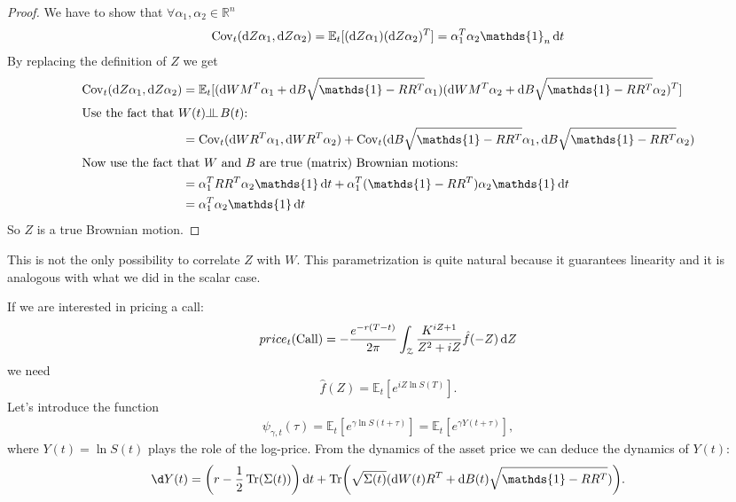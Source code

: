 \begin{proof}
    We have to show that $\forall \alpha_1,\alpha_2\in\mathbb{R}^n$
    \begin{align*}
        \Cov_t(\dd Z\alpha_1, \dd Z\alpha_2) = \mathbb{E}_t[(\dd Z\alpha_1)(\dd Z\alpha_2)^T] = \alpha_1^T\alpha_2\mathds{1}_n\,\dd t
    \end{align*}
    By replacing the definition of $Z$ we get
    \begin{align*}
        \Cov_t(\dd Z\alpha_1, \dd Z\alpha_2) &= \mathbb{E}_t[(\dd WM^T\alpha_1 + \dd B\sqrt{\mathds{1}-RR^T}\alpha_1)(\dd WM^T\alpha_2 + \dd B\sqrt{\mathds{1}-RR^T}\alpha_2)^T] \\
        \intertext{Use the fact that $W(t)\indep\, B(t)$:}
        &=
        \Cov_t(\dd WR^T\alpha_1, \dd WR^T\alpha_2) + \Cov_t(\dd B\sqrt{\mathds{1}-RR^T}\alpha_1, \dd B\sqrt{\mathds{1}-RR^T}\alpha_2) \\
        \intertext{Now use the fact that $W$ and $B$ are true (matrix) Brownian motions:}
        &=
        \alpha_1^T RR^T \alpha_2\mathds{1}\,\dd t + \alpha_1^T(\mathds{1}-RR^T)\alpha_2\mathds{1}\,\dd t \\
        &=
        \alpha_1^T\alpha_2\mathds{1}\,\dd t
    \end{align*}
    So $Z$ is a true Brownian motion.
\end{proof}
\begin{remark}
    This is not the only possibility to correlate $Z$ with $W$. This parametrization is quite natural because it guarantees linearity and it is analogous with what we did in the scalar case.
\end{remark}
If we are interested in pricing a call:
\begin{align*}
    price_t(\operatorname{Call}) = -\frac{e^{-r(T-t)}}{2\pi}\int_{\mathcal{Z}}\frac{K^{iZ+1}}{Z^2+iZ}\hat{f}(-Z)\,\dd Z
\end{align*}
we need
\begin{equation*}
    \hat{f}(Z) = \mathbb{E}_t[e^{iZ\ln S(T)}].
\end{equation*}
Let's introduce the function
\begin{align}
    \psi_{\gamma, t}(\tau) = \mathbb{E}_t\left[e^{\gamma\ln S(t+\tau)}\right] = \mathbb{E}_t\left[e^{\gamma Y(t+\tau)}\right],
\end{align}
where $Y(t) = \ln S(t)$ plays the role of the log-price. From the dynamics of the asset price we can deduce the dynamics of $Y(t)$:
\begin{equation*}
    \d Y(t) = \left(r-\frac{1}{2}\Tr(\Sigma(t))\right)\dd t + \Tr(\sqrt{\Sigma(t)}(\dd W(t)R^T+\dd B(t)\sqrt{\mathds{1}-RR^T})).
\end{equation*}
